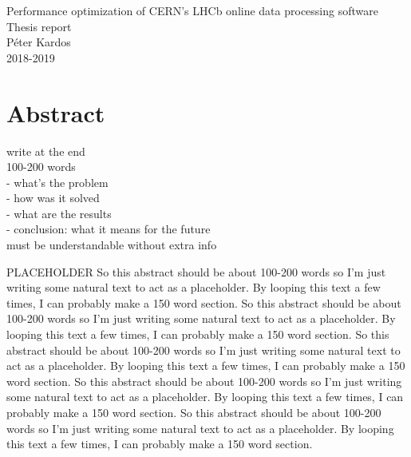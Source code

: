 \documentclass[12pt]{article}
\begin{document}
	
	
	\begin{center}
		\Huge Performance optimization of CERN's LHCb online data processing software \\
		\Large Thesis report\\
		\vspace{1pc}
		\huge Péter Kardos \\
		\large 2018-2019
	\end{center}
	
	
	\section{Abstract}
	
	\color{red}
	write at the end \\
	100-200 words \\
	- what's the problem \\
	- how was it solved \\
	- what are the results \\
	- conclusion: what it means for the future \\
	must be understandable without extra info	
	\color{black}
	\vspace{1.5pc}
		
	PLACEHOLDER
	So this abstract should be about 100-200 words so I'm just writing some natural text to act as a placeholder. By looping this text a few times, I can probably make a 150 word section. So this abstract should be about 100-200 words so I'm just writing some natural text to act as a placeholder. By looping this text a few times, I can probably make a 150 word section. So this abstract should be about 100-200 words so I'm just writing some natural text to act as a placeholder. By looping this text a few times, I can probably make a 150 word section. So this abstract should be about 100-200 words so I'm just writing some natural text to act as a placeholder. By looping this text a few times, I can probably make a 150 word section. So this abstract should be about 100-200 words so I'm just writing some natural text to act as a placeholder. By looping this text a few times, I can probably make a 150 word section.
	
\end{document}
